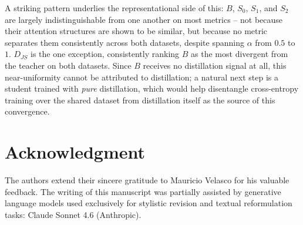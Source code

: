 \documentclass[conference]{IEEEtran}
\begin{document}
A striking pattern underlies the representational side of this: $B$, $S_0$, $S_1$, and $S_2$ are largely indistinguishable from one another on most metrics -- not because their attention structures are shown to be similar, but because no metric separates them consistently across both datasets, despite spanning $\alpha$ from $0.5$ to $1$. $D_{JS}$ is the one exception, consistently ranking $B$ as the most divergent from the teacher on both datasets. Since $B$ receives no distillation signal at all, this near-uniformity cannot be attributed to distillation; a natural next step is a student trained with \emph{pure} distillation, which would help disentangle cross-entropy training over the shared dataset from distillation itself as the source of this convergence.

\section*{Acknowledgment}

The authors extend their sincere gratitude to Mauricio Velasco for his valuable feedback. The writing of this manuscript was partially assisted by generative language models used exclusively for stylistic revision and textual reformulation tasks: Claude Sonnet 4.6 \cite{anthropic2025claude} (Anthropic).



\end{document}
